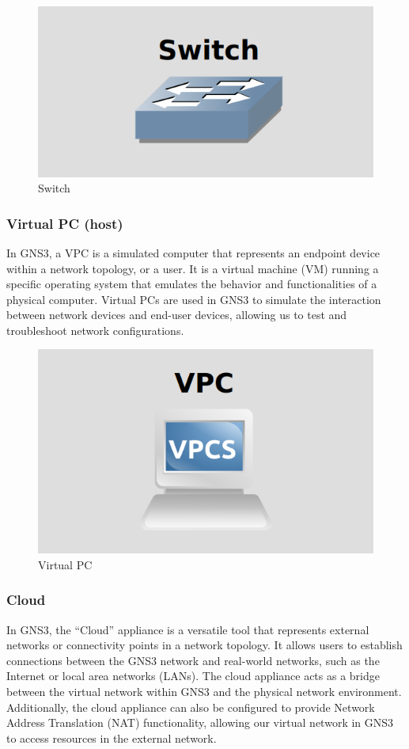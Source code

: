 \begin{figure}[h]
    \centering
    \includegraphics[width=0.4\linewidth]{Images/switch.png}
    \caption{Switch}
    \label{fig:example}
\end{figure}


\subsubsection{Virtual PC (host)}

In GNS3, a \gls{VPC} is a simulated computer that represents an endpoint device within a network topology, or a user. It is a virtual machine (VM) running a specific operating system that emulates the behavior and functionalities of a physical computer. Virtual PCs are used in GNS3 to simulate the interaction between network devices and end-user devices, allowing us to test and troubleshoot network configurations.

\begin{figure}[h]
    \centering
    \includegraphics[width=0.4\linewidth]{Images/vpc.png}
    \caption{Virtual PC}
    \label{fig:example}
\end{figure}

\subsubsection{Cloud}

In GNS3, the ``Cloud'' appliance is a versatile tool that represents external networks or connectivity points in a network topology. It allows users to establish connections between the GNS3 network and real-world networks, such as the Internet or local area networks (LANs). The cloud appliance acts as a bridge between the virtual network within GNS3 and the physical network environment. Additionally, the cloud appliance can also be configured to provide Network Address Translation (NAT) functionality, allowing our virtual network in GNS3 to access resources in the external network.

